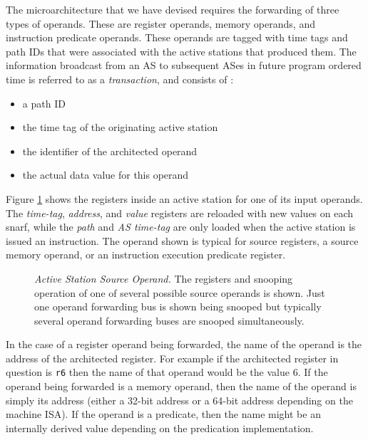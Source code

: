 \documentclass[10pt,twocolumn,dvips]{article}
\begin{document}
The microarchitecture that we have devised requires the
forwarding of three types of operands.  These are register
operands, memory operands, and instruction predicate operands.
These operands are tagged with time tags and path IDs that were associated
with the active stations that produced them.
The information 
broadcast from an AS to subsequent
ASes in future program ordered time is referred
to as a {\em transaction}, and consists of :
\vspace{-0.05in}
\begin{itemize}
\vspace{-0.1in}
\item{a path ID}
\vspace{-0.1in}
\item{the time tag of the originating active station}
\vspace{-0.1in}
\item{the identifier of the architected operand}
\vspace{-0.1in}
\item{the actual data value for this operand}
\vspace{-0.1in}
\end{itemize}   

Figure \ref{fig:source} shows the registers inside an active
station for one of its input operands.  The 
{\em time-tag},
{\em address}, and
{\em value} registers are reloaded with new values on each snarf,
while the
{\em path} and
{\em AS time-tag} are only loaded when the active station is
issued an instruction.
The operand shown is typical for source registers, a source memory
operand, or an instruction execution predicate register.
\begin{figure}
\centering
{}
\caption{{\em Active Station Source Operand.} The registers and snooping
operation of one of several possible source operands is shown.
Just one operand forwarding bus is shown being snooped but
typically several operand forwarding buses are snooped simultaneously.}
\label{fig:source}
\end{figure}
In the case of a register operand being forwarded, the name of the
operand is the address of the architected register.  For example
if the architected register in question is {\tt r6} then the
name of that operand would be the value 6.  If the operand
being forwarded is a memory operand, then the name of the operand
is simply its address (either a 32-bit address or a 64-bit address
depending on the machine ISA).  If the operand is a predicate,
then the name might be an internally derived value depending on
the predication implementation. 
\end{document}
